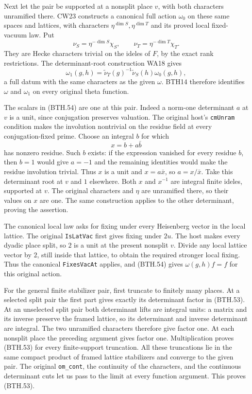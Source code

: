 Next let the pair be supported at a nonsplit place
\(v\), with both characters unramified there.
CW23 constructs a canonical full action \(\omega_0\)
on these same spaces and lattices, with characters
\(\eta^{\dim S},\eta^{\dim T}\) and its proved
local fixed-vacuum law.  Put
\[
 \nu_S=\eta^{-\dim S}\chi_S,\qquad
 \nu_T=\eta^{-\dim T}\chi_T.
\]
They are Hecke characters trivial on the ideles of
\(F\), by the exact rank restrictions.
The determinant-root construction WA18 gives
\[
 \omega_1(g,h)=\widetilde\nu_T(g)^{-1}
                  \widetilde\nu_S(h)\omega_0(g,h),             \tag{BTH.54}
\]
a full datum with the same characters as the
given \(\omega\).
BTH14 therefore identifies \(\omega\) and
\(\omega_1\) on every original theta function.

The scalars in (BTH.54) are one at this pair.
Indeed a norm-one determinant \(a\) at \(v\) is
a unit, since conjugation preserves valuation.
The original host's \texttt{cm\allowbreak Unram} condition
makes the involution nontrivial on the residue
field at every conjugation-fixed prime.
Choose an integral \(b\) for which
\[
                  x=b+a\bar b
\]
has nonzero residue.  Such \(b\) exists: if the
expression vanished for every residue \(b\), then
\(b=1\) would give \(a=-1\) and the remaining
identities would make the residue involution
trivial.  Thus \(x\) is a unit and
\(x=a\bar x\), so \(a=x/\bar x\).
Take this determinant root at \(v\) and \(1\)
elsewhere.  Both \(x\) and \(x^{-1}\) are
integral finite ideles, supported at \(v\).
The original characters and \(\eta\) are
unramified there, so their values on \(x\)
are one.  The same construction applies to
the other determinant, proving the assertion.

The canonical local law asks for fixing under
every Heisenberg vector in the local lattice.
The original \texttt{Is\allowbreak Lat\allowbreak Vac} first gives fixing
under \(2u\).  The host makes every dyadic
place split, so \(2\) is a unit at the present
nonsplit \(v\).  Divide any local lattice vector
by \(2\), still inside that lattice, to obtain
the required stronger local fixing.  Thus the
canonical \texttt{Fixes\allowbreak Vac\allowbreak At} applies, and
(BTH.54) gives \(\omega(g,h)f=f\) for this
original action.

For the general finite stabilizer pair, first
truncate to finitely many places.
At a selected split pair the first part gives
exactly its determinant factor in (BTH.53).
At an unselected split pair both determinant
lifts are integral units: a matrix and its
inverse preserve the framed lattice, so its
determinant and inverse determinant are integral.
The two unramified characters therefore give
factor one.  At each nonsplit place the preceding
argument gives factor one.  Multiplication proves
(BTH.53) for every finite-support truncation.
All these truncations lie in the same compact
product of framed lattice stabilizers and
converge to the given pair.  The original
\texttt{om\_\allowbreak cont}, the continuity of the
characters, and the continuous determinant cuts
let us pass to the limit at every function
argument.  This proves (BTH.53).

